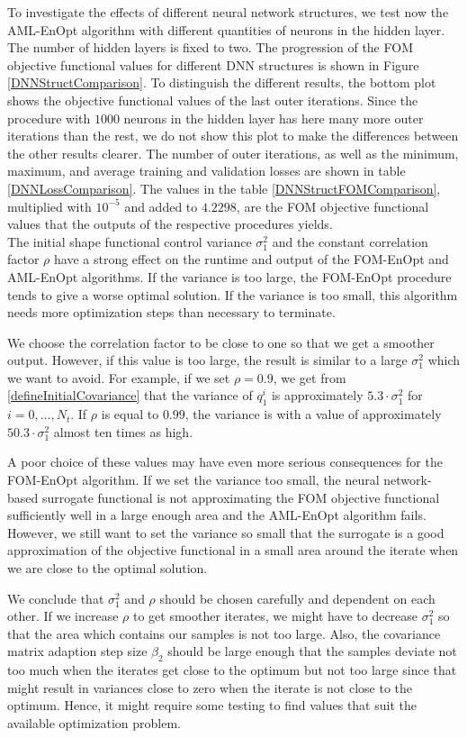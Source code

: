 To investigate the effects of different neural network structures, we test now the AML-EnOpt algorithm with different quantities of neurons in the hidden layer. The number of hidden layers is fixed to two. The progression of the FOM objective functional values for different DNN structures is shown in Figure \ref{DNNStructComparison}. To distinguish the different results, the bottom plot shows the objective functional values of the last outer iterations. Since the procedure with $1000$ neurons in the hidden layer has here many more outer iterations than the rest, we do not show this plot to make the differences between the other results clearer. The number of outer iterations, as well as the minimum, maximum, and average training and validation losses are shown in table \ref{DNNLossComparison}. The values in the table \ref{DNNStructFOMComparison}, multiplied with $10^{-5}$ and added to $4.2298$, are the FOM objective functional values that the outputs of the respective procedures yields.\\

The initial shape functional control variance $\sigma^2_1$ and the constant correlation factor $\rho$ have a strong effect on the runtime and output of the FOM-EnOpt and AML-EnOpt algorithms. If the variance is too large, the FOM-EnOpt procedure tends to give a worse optimal solution. If the variance is too small, this algorithm needs more optimization steps than necessary to terminate.

We choose the correlation factor to be close to one so that we get a smoother output. However, if this value is too large, the result is similar to a large $\sigma^2_1$ which we want to avoid. For example, if we set $\rho=0.9$, we get from \eqref{defineInitialCovariance} that the variance of $q^i_1$ is approximately $5.3\cdot\sigma^2_1$ for $i=0,\dotsc,N_t$. If $\rho$ is equal to $0.99$, the variance is with a value of approximately $50.3\cdot\sigma^2_1$ almost ten times as high.

A poor choice of these values may have even more serious consequences for the FOM-EnOpt algorithm. If we set the variance too small, the neural network-based surrogate functional is not approximating the FOM objective functional sufficiently well in a large enough area and the AML-EnOpt algorithm fails. However, we still want to set the variance so small that the surrogate is a good approximation of the objective functional in a small area around the iterate when we are close to the optimal solution.

We conclude that $\sigma^2_1$ and $\rho$ should be chosen carefully and dependent on each other. If we increase $\rho$ to get smoother iterates, we might have to decrease $\sigma^2_1$ so that the area which contains our samples is not too large. Also, the covariance matrix adaption step size $\beta_2$ should be large enough that the samples deviate not too much when the iterates get close to the optimum but not too large since that might result in variances close to zero when the iterate is not close to the optimum. Hence, it might require some testing to find values that suit the available optimization problem.\\

